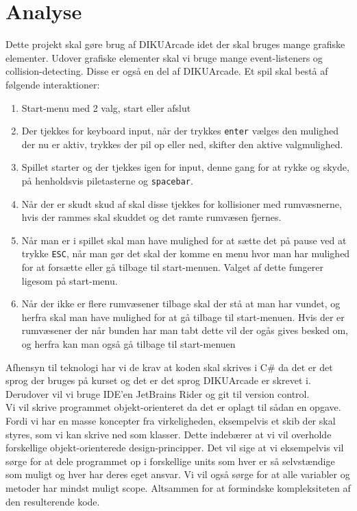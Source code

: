 \section{Analyse}
Dette projekt skal gøre brug af DIKUArcade idet der skal bruges mange grafiske elementer. Udover grafiske elementer skal vi bruge mange event-listeners og collision-detecting. Disse er også en del af DIKUArcade. Et spil skal bestå af følgende interaktioner:
\begin{enumerate}
  \item Start-menu med 2 valg, start eller afslut
  \item Der tjekkes for keyboard input, når der trykkes \texttt{enter} vælges den mulighed der nu er aktiv, trykkes der pil op eller ned, skifter den aktive valgmulighed.
  \item Spillet starter og der tjekkes igen for input, denne gang for at rykke og skyde, på henholdsvis piletasterne og \texttt{spacebar}.
  \item Når der er skudt skud af skal disse tjekkes for kollisioner med rum\-væsnerne, hvis der rammes skal skuddet og det ramte rumvæsen fjernes.
  \item Når man er i spillet skal man have mulighed for at sætte det på pause ved at trykke \texttt{ESC}, når man gør det skal der komme en menu hvor man har mulighed for at forsætte eller gå tilbage til start-menuen. Valget af dette fungerer ligesom på start-menu.
  \item Når der ikke er flere rumvæsener tilbage skal der stå at man har vundet, og herfra skal man have mulighed for at gå tilbage til start-menuen. Hvis der er rumvæsener der når bunden har man tabt dette vil der ogås gives besked om, og herfra kan man også gå tilbage til start-menuen
\end{enumerate}
Afhensyn til teknologi har vi de krav at koden skal skrives i C\# da det er det sprog der bruges på kurset og det er det sprog DIKUArcade er skrevet i. Derudover vil vi bruge IDE'en JetBrains Rider og git til version control.\\
Vi vil skrive programmet objekt-orienteret da det er oplagt til sådan en opgave. Fordi vi har en masse koncepter fra virkeligheden, eksempelvis et skib der skal styres, som vi kan skrive ned som klasser. Dette indebærer at vi vil overholde forskellige objekt-orienterede design-principper. Det vil sige at vi eksempelvis vil sørge for at dele programmet op i forskellige units som hver er så selvstændige som muligt og hver har deres eget ansvar. Vi vil også sørge for at alle variabler og metoder har mindst muligt scope. Altsammen for at formindske kompleksiteten af den resulterende kode.
